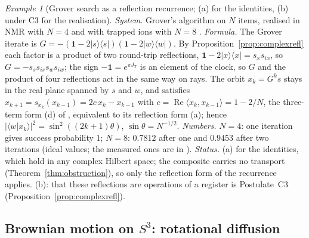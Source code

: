 \documentclass[aps,pra,onecolumn,superscriptaddress,nofootinbib,10pt]{revtex4-2}
\theoremstyle{definition}
\theoremstyle{remark}
\newtheorem{example}[theorem]{Example}
\begin{document}
\begin{example}[Grover search as a reflection recurrence; (a) for the identities, (b) under C3 for the realisation]\label{ex:grover}
\emph{System.}  Grover's algorithm \cite{ex-Grover97} on $N$ items, realised in NMR with $N=4$ \cite{ex-CGK98} and
with trapped ions with $N=8$ \cite{ex-Figgatt17}.
\emph{Formula.}  The Grover iterate is $G=-(\mathbf1-2|s\rangle\langle s|)(\mathbf1-2|w\rangle\langle w|)$.  By
Proposition~\ref{prop:complexrefl} each factor is a product of two round-trip reflections,
$\mathbf1-2|x\rangle\langle x|=s_xs_{ix}$, so $G=-s_ss_{is}s_ws_{iw}$; the sign $-\mathbf1=e^{\pi J_T}$ is an element of the
clock, so $G$ and the product of four reflections act in the same way on rays.  The orbit $x_k=G^ks$ stays
in the real plane spanned by $s$ and $w$, and satisfies $x_{k+1}=s_{x_k}(x_{k-1})=2c\,x_k-x_{k-1}$ with
$c=\operatorname{Re}\langle x_k,x_{k-1}\rangle=1-2/N$, the three-term form (d) of \cite[Thm.~6.2]{PaperI}, equivalent to its reflection form (a); hence
$\lvert\langle w|x_k\rangle\rvert^2=\sin^2((2k+1)\theta)$, $\sin\theta=N^{-1/2}$.
\emph{Numbers.}  $N=4$: one iteration gives success probability $1$; $N=8$: $0.7812$ after one and $0.9453$
after two iterations (ideal values; the measured ones are in \cite{ex-Figgatt17}).
\emph{Status.}  (a) for the identities, which hold in any complex Hilbert space; the composite carries no
transport (Theorem~\ref{thm:obstruction}), so only the reflection form of the recurrence applies.  (b): that
these reflections are operations of a register is Postulate~C3 (Proposition~\ref{prop:complexrefl}).
\end{example}

\subsection{Brownian motion on $S^3$: rotational diffusion}
\end{document}
